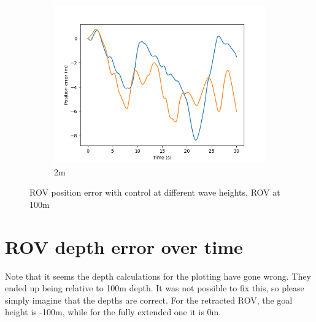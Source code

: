 \documentclass[class=article, crop=false]{standalone}
\begin{document}
\begin{figure}
\begin{subfigure}[b]{0.48\textwidth}
        \includegraphics{scenario1/rov-100m/2.0m/rov_position_error_controlled}
        \caption{2m}
        \label{}
    \end{subfigure}

    \caption{ROV position error with control at different wave heights, ROV at 100m}
\end{figure}
\FloatBarrier
\section{ROV depth error over time}
Note that it seems the depth calculations for the plotting have gone wrong. They ended up being relative to 100m depth. It was not possible to fix this, so please simply imagine that the depths are correct. For the retracted ROV, the goal height is -100m, while for the fully extended one it is 0m.
\end{document}

